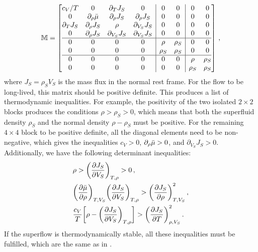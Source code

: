 \documentclass[a4paper, amsfonts, amssymb, amsmath, reprint, showkeys, nofootinbib, twoside,notitlepage,onecolumn]{revtex4-2}
\theoremstyle{definition}
\theoremstyle{theorem}
\theoremstyle{corollary}
\begin{document}
\begin{equation}
\mathbb{M} =
\left[
\begin{array}{@{}cccc|cc|cc@{}}
c_V/T & 0 & \partial_T J_S & 0 & 0 & 0 & 0 & 0\\
0 & \partial_\rho \Bar{\mu} & \partial_\rho J_S &  \partial_\rho J_S & 0 & 0 & 0 & 0\\
\partial_T J_S & \partial_\rho J_S & \rho & \partial_{V_S}J_S & 0 & 0 & 0 & 0\\
0 &  \partial_\rho J_S & \partial_{V_S}J_S &  \partial_{V_S}J_S & 0 & 0 & 0 & 0\\
\hline
0 & 0 & 0 & 0 & \rho & \rho_S & 0 & 0\\
0 & 0 & 0 & 0 & \rho_S & \rho_S & 0 & 0\\
\hline
0 & 0 & 0 & 0 & 0 & 0 & \rho & \rho_S \\
0 & 0 & 0 & 0 & 0 & 0 & \rho_S & \rho_S \\
\end{array} 
\right] \, ,
\end{equation}
where $J_S=\rho_S V_S$ is the mass flux in the normal rest frame. For the flow to be long-lived, this matrix should be positive definite. This produces a list of thermodynamic inequalities. For example, the positivity of the two isolated $2 \times 2$ blocks produces the conditions $\rho>\rho_S>0$, which means that both the superfluid density $\rho_S$ and the normal density $\rho-\rho_S$ must be positive. For the remaining $4\times 4$ block to be positive definite, all the diagonal elements need to be non-negative, which gives the inequalities $c_V>0$, $\partial_\rho \Bar{\mu}>0$, and $ \partial_{V_S}J_S>0$. Additionally, we have the following determinant inequalities: 
\begin{equation}
\label{eq:StabilitySingle}
\begin{split}
& \rho > \bigg(\dfrac{\partial J_S}{\partial V_S}\bigg)_{T,\rho} >0 \, , \\
& \bigg( \dfrac{\partial \Bar{\mu}}{\partial\rho}\bigg)_{T,V_S} \bigg(\dfrac{\partial J_S}{\partial V_S} \bigg)_{T,\rho} > \bigg(\dfrac{\partial J_S}{\partial \rho} \bigg)^2_{T,V_S} \, ,\\
& \dfrac{c_V}{T}\bigg[ \rho-\bigg(\dfrac{\partial J_S}{\partial V_S} \bigg)_{T,\rho} \bigg] > \bigg(\dfrac{\partial J_S}{\partial T} \bigg)^2_{\rho,V_S} \, . \\
\end{split}
\end{equation}
If the superflow is thermodynamically stable, all these inequalities must be fulfilled, which are the same as in \cite{Andreev2004}.
\end{document}
